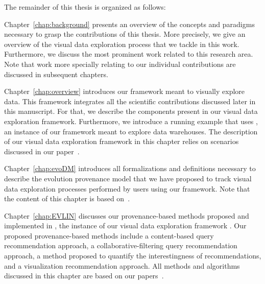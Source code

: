 The remainder of this thesis is organized as follows:


\bigskip Chapter~\ref{chap:background} presents an overview of the concepts and paradigms necessary to grasp the contributions of this thesis. 
More precisely, we give an overview of the visual data exploration process that we tackle in this work. Furthermore, we discuss the most prominent work related to this research area. 
Note that work more specially relating to our individual contributions are discussed in subsequent chapters.

\bigskip 
Chapter~\ref{chap:overview} introduces our framework \framework{} meant to visually explore data.
This framework integrates all the scientific contributions discussed later in this manuscript. 
For that, we describe the components present in our visual data exploration framework. 
Furthermore, we introduce a running example that uses \prototype{}, an instance of our framework meant to explore data warehouses.
The description of our visual data exploration framework in this chapter relies on scenarios discussed in our paper~\cite{BHBK18:Demo}.

\bigskip Chapter~\ref{chap:evoDM} introduces all formalizations and definitions necessary to describe the evolution provenance model that we have proposed to track visual data exploration processes performed by users using our framework. 
Note that the content of this chapter is based on~\cite{Houssem:17:tapp}.




\bigskip 
Chapter~\ref{chap:EVLIN} discusses our provenance-based methods  proposed and implemented in \prototype{}, the instance of our visual data exploration framework \framework{}.
Our proposed provenance-based methods include a content-based query recommendation approach, a collaborative-filtering query recommendation approach, a method proposed to quantify the interestingness of recommendations, and a visualization recommendation approach.
All methods and algorithms discussed in this chapter are based on our papers~\cite{Houssem:17:tapp,BHBK18:Demo,Houssem:19:adbis,Houssem:19:IS}.


